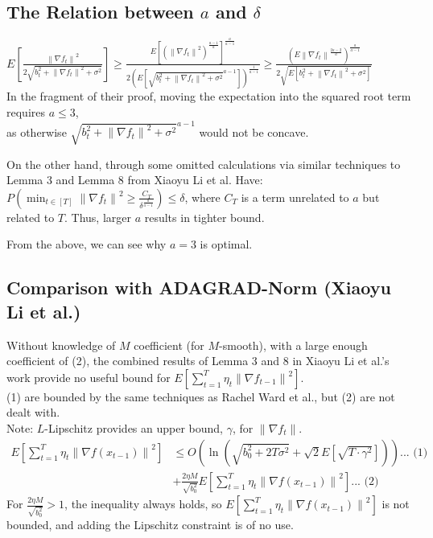 \documentclass[14pt,onecolumn,letterpaper]{extarticle}
\begin{document}
\subsection{The Relation between $a$ and $\delta$}
$E\left[\frac{\left\|\nabla f_t\right\|^2}{2 \sqrt{b_t^2+\left\|\nabla f_t\right\|^2+\sigma^2}}\right] \geq \frac{E\left[\left(\left\|\nabla f_t\right\|^2\right)^{\frac{a-1}{a}}\right]^{\frac{a}{a-1}}}{2
\left(E\left[\sqrt{b_t^2+\left\|\nabla f_t\right\|^2+\sigma^2}^{a-1}\right]\right)^{\frac{1}{a-1}}} \geq \frac{\left(E\left\|\nabla f_t\right\|^{\frac{2a-2}{a}}\right)^{\frac{a}{a-1}}}{2 \sqrt{E\left[b_t^2+\left\|\nabla f_t\right\|^2+\sigma^2\right]}}$
\\In the fragment of their proof, moving the expectation into the squared root term requires $a\leq3$, \\
as otherwise $\sqrt{b_t^2+\left\|\nabla f_t\right\|^2+\sigma^2}^{a-1}$ would not be concave.\par
On the other hand, through some omitted calculations via similar techniques to Lemma 3 and Lemma 8 from Xiaoyu Li et al. Have:
$P\left(\min _{t \in[T]}\left\|\nabla f_t\right\|^2 \geq \frac{C_T}{\delta^{\frac{a}{a-1}}}\right)\leq \delta$, where $C_T$ is a term unrelated to $a$ but related to $T$. Thus, larger $a$ results in tighter bound. \par
From the above, we can see why $a = 3$ is optimal.
\subsection{Comparison with ADAGRAD-Norm (Xiaoyu Li et al.)}
Without knowledge of $M$ coefficient (for $M$-smooth), with a large enough coefficient of (2), the combined results of Lemma 3 and 8 in Xiaoyu Li et al.'s work provide no useful bound for $E\left[\sum_{t=1}^T \eta_t\left\|\nabla f_{t-1}\right\|^2\right]$.\\ 
    
(1) are bounded by the same techniques as Rachel Ward et al., but (2) are not dealt with. \\Note: $L$-Lipschitz provides an upper bound, $\gamma$, for $\left\|\nabla f_t\right\|$. 
\\
$\begin{aligned}  E\left[\sum_{t=1}^T \eta_t\left\|\nabla f\left(x_{t-1}\right)\right\|^2\right] &\leq O\left( \ln \left(\sqrt{b_0^2+2 T \sigma^2}+\sqrt{2} E\left[\sqrt{T\cdot \gamma^2}\right]\right)\right)\text{... (1)} \\ 
& +\frac{2 \eta M}{\sqrt{b_0^2}} E\left[\sum_{t=1}^T \eta_t\left\|\nabla f\left(x_{t-1}\right)\right\|^2\right]\text{... (2)}\end{aligned}$
\\For $\frac{2 \eta M}{\sqrt{b_0^2}} > 1$, the inequality always holds, so $E\left[\sum_{t=1}^T \eta_t\left\|\nabla f\left(x_{t-1}\right)\right\|^2\right]$ is not bounded, and adding the Lipschitz constraint is of no use.
\end{document}
